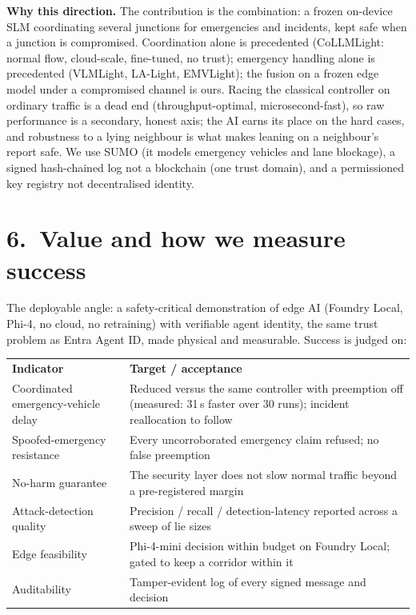 \documentclass[11pt]{article}
\newcommand{\hd}[1]{{\color{nbblue}\textbf{#1}}}
\begin{document}
\vspace{5pt}
\hd{Why this direction.} The contribution is the combination: a frozen on-device SLM coordinating several junctions for emergencies and incidents, kept safe when a junction is compromised. Coordination alone is precedented (CoLLMLight: normal flow, cloud-scale, fine-tuned, no trust); emergency handling alone is precedented (VLMLight, LA-Light, EMVLight); the fusion on a frozen edge model under a compromised channel is ours. Racing the classical controller on ordinary traffic is a dead end (throughput-optimal, microsecond-fast), so raw performance is a secondary, honest axis; the AI earns its place on the hard cases, and robustness to a lying neighbour is what makes leaning on a neighbour's report safe. We use SUMO (it models emergency vehicles and lane blockage), a signed hash-chained log not a blockchain (one trust domain), and a permissioned key registry not decentralised identity.

\vspace{3pt}
\section{6.\ Value and how we measure success}
The deployable angle: a safety-critical demonstration of edge AI (Foundry Local, Phi-4, no cloud, no retraining) with verifiable agent identity, the same trust problem as Entra Agent ID, made physical and measurable. Success is judged on:

\vspace{3pt}
{\scriptsize\setlength{\tabcolsep}{5pt}
\begin{tabular}{>{\raggedright\arraybackslash}p{5.2cm} >{\raggedright\arraybackslash}p{12.4cm}}
\rowcolor{nbblue!18}
\textbf{Indicator} & \textbf{Target / acceptance} \\
Coordinated emergency-vehicle delay & Reduced versus the same controller with preemption off (measured: 31\,s faster over 30 runs); incident reallocation to follow \\
Spoofed-emergency resistance & Every uncorroborated emergency claim refused; no false preemption \\
No-harm guarantee & The security layer does not slow normal traffic beyond a pre-registered margin \\
Attack-detection quality & Precision / recall / detection-latency reported across a sweep of lie sizes \\
Edge feasibility & Phi-4-mini decision within budget on Foundry Local; gated to keep a corridor within it \\
Auditability & Tamper-evident log of every signed message and decision \\
\end{tabular}}
\end{document}
